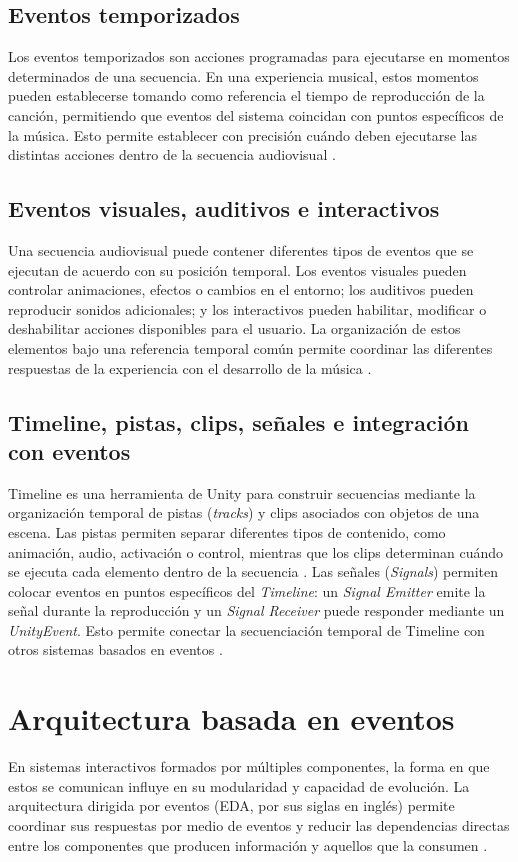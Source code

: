 \subsection{Eventos temporizados}
Los eventos temporizados son acciones programadas para ejecutarse en momentos determinados de una secuencia. En una experiencia musical, estos momentos pueden establecerse tomando como referencia el tiempo de reproducción de la canción, permitiendo que eventos del sistema coincidan con puntos específicos de la música. Esto permite establecer con precisión cuándo deben ejecutarse las distintas acciones dentro de la secuencia audiovisual \cite{van2003gamepulse}.
\subsection{Eventos visuales, auditivos e interactivos}
Una secuencia audiovisual puede contener diferentes tipos de eventos que se ejecutan de acuerdo con su posición temporal. Los eventos visuales pueden controlar animaciones, efectos o cambios en el entorno; los auditivos pueden reproducir sonidos adicionales; y los interactivos pueden habilitar, modificar o deshabilitar acciones disponibles para el usuario. La organización de estos elementos bajo una referencia temporal común permite coordinar las diferentes respuestas de la experiencia con el desarrollo de la música \cite{edmunds2006mixed,van2003gamepulse}.
\subsection{Timeline, pistas, clips, señales e integración con eventos}
Timeline es una herramienta de Unity para construir secuencias mediante la organización temporal de pistas (\emph{tracks}) y clips asociados con objetos de una escena. Las pistas permiten separar diferentes tipos de contenido, como animación, audio, activación o control, mientras que los clips determinan cuándo se ejecuta cada elemento dentro de la secuencia \cite{unity2026timeline}. Las señales (\emph{Signals}) permiten colocar eventos en puntos específicos del \emph{Timeline}: un \emph{Signal Emitter} emite la señal durante la reproducción y un \emph{Signal Receiver} puede responder mediante un \emph{UnityEvent}. Esto permite conectar la secuenciación temporal de Timeline con otros sistemas basados en eventos \cite{unity2026signalemitter}.

% 
\section{Arquitectura basada en eventos}
En sistemas interactivos formados por múltiples componentes, la forma en que estos se comunican influye en su modularidad y capacidad de evolución. La arquitectura dirigida por eventos (EDA, por sus siglas en inglés) permite coordinar sus respuestas por medio de eventos y reducir las dependencias directas entre los componentes que producen información y aquellos que la consumen \cite{eugster2003publish,oberhauser2023vr}.
